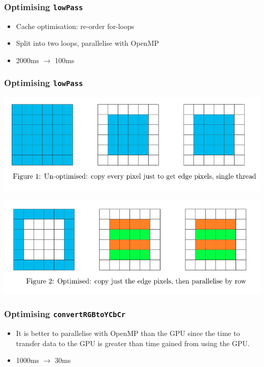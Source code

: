 \begin{frame}
  \frametitle{Optimising \lstinline{lowPass}}

  \begin{itemize}
  \item Cache optimisation: re-order for-loops
  \item Split into two loops, parallelise with OpenMP
  \item 2000ms $\to$ 100ms
  \end{itemize}

\end{frame}

\begin{frame}
  \frametitle{Optimising \lstinline{lowPass}}
  \begin{center}
          \includegraphics[width=.8\textwidth]{lowPassUnoptimised.png}
  \end{center}
  \begin{center}
            \includegraphics[width=.8\textwidth]{lowPassOptimised.png}
  \end{center}

\end{frame}

\begin{frame}
  \frametitle{Optimising \lstinline{convertRGBtoYCbCr}}
  \begin{itemize}
    \item It is better to parallelise with OpenMP than the GPU since the time to transfer data to the GPU is greater than time gained from using the GPU.
    \item 1000ms $\to$ 30ms
  \end{itemize}

  \begin{exampleblock}{}
    
  \end{exampleblock}

\end{frame}



